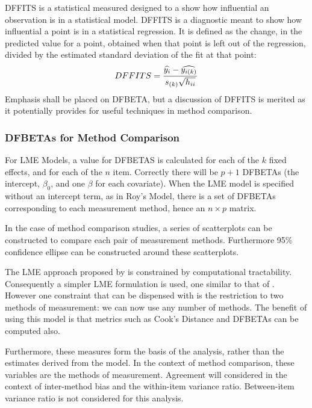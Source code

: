 \documentclass[12pt, a4paper]{report}
\theoremstyle{plain}
\theoremstyle{definition}
\theoremstyle{remark}
\begin{document}
DFFITS is a statistical measured designed to a show how influential an observation is in a statistical model. DFFITS is a diagnostic meant to show how influential a point is in a statistical regression. It is defined as the change, in the predicted value for a point, obtained when that point is left out of the regression, divided by the estimated standard deviation of the fit at that point:
\begin{displaymath} DFFITS = {\widehat{y_i} -
	\widehat{y_{i(k)}} \over s_{(k)} \sqrt{h_{ii}}} \end{displaymath}
Emphasis shall be placed on DFBETA, but a discussion of DFFITS is merited as it potentially provides for useful techniques in method comparison.
	

	

	\subsubsection{DFBETAs for Method Comparison}
	
	For LME Models, a value for DFBETAS is calculated for each of the $k$ fixed effects, and for each of the $n$ item. Correctly there will be $p+1$ DFBETAs (the intercept, $\beta_0$, and one $\beta$ for each covariate). When the LME model is specified without an intercept term, as in Roy's Model, there is a set of DFBETAs corresponding to each measurement method, hence an $n \times p$ matrix.
	
	In the case of method comparison studies, a series of scatterplots can be constructed to compare each pair of measurement methods.
	Furthermore 95\% confidence ellipse can be constructed around these scatterplots.
	
	
	
	The LME approach proposed by \citet{ARoy2009} is constrained by computational tractability.
	Consequently a simpler LME formulation is used, one similar to that of \citet{BXC2008}. However one constraint that can be dispensed with is the restriction to
	two methods of measurement: we can now use any number of methods.
	The benefit of using this model is that metrics such as Cook's Distance and DFBETAs can be computed also.

Furthermore, these measures form the basis of the analysis, rather than the estimates derived from the model. In the context of method comparison, these variables are the methods of measurement.
Agreement will considered in the context of inter-method bias and the within-item variance ratio. Between-item variance ratio is not considered for this analysis.
\end{document}

